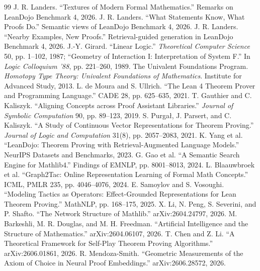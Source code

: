 \documentclass[11pt]{article}
\begin{document}
\begin{thebibliography}{99}\scriptsize
\setlength{\itemsep}{0pt}
 J. R. Landers. ``Textures of Modern Formal Mathematics.'' Remarks on LeanDojo Benchmark 4, 2026.
 J. R. Landers. ``What Statements Know, What Proofs Do.'' Semantic views of LeanDojo Benchmark 4, 2026.
 J. R. Landers. ``Nearby Examples, New Proofs.'' Retrieval-guided generation in LeanDojo Benchmark 4, 2026.
 J.-Y. Girard. ``Linear Logic.'' \emph{Theoretical Computer Science} 50, pp. 1--102, 1987; ``Geometry of Interaction I: Interpretation of System F.'' In \emph{Logic Colloquium '88}, pp. 221--260, 1989.
 The Univalent Foundations Program. \emph{Homotopy Type Theory: Univalent Foundations of Mathematics}. Institute for Advanced Study, 2013.
 L. de Moura and S. Ullrich. ``The Lean 4 Theorem Prover and Programming Language.'' CADE 28, pp. 625--635, 2021.
 T. Gauthier and C. Kaliszyk. ``Aligning Concepts across Proof Assistant Libraries.'' \emph{Journal of Symbolic Computation} 90, pp. 89--123, 2019.
 S. Purga\l, J. Parsert, and C. Kaliszyk. ``A Study of Continuous Vector Representations for Theorem Proving.'' \emph{Journal of Logic and Computation} 31(8), pp. 2057--2083, 2021.
 K. Yang et al. ``LeanDojo: Theorem Proving with Retrieval-Augmented Language Models.'' NeurIPS Datasets and Benchmarks, 2023.
 G. Gao et al. ``A Semantic Search Engine for Mathlib4.'' Findings of EMNLP, pp. 8001--8013, 2024.
 L. Blaauwbroek et al. ``Graph2Tac: Online Representation Learning of Formal Math Concepts.'' ICML, PMLR 235, pp. 4046--4076, 2024.
 E. Samoylov and S. Vosoughi. ``Modeling Tactics as Operators: Effect-Grounded Representations for Lean Theorem Proving.'' MathNLP, pp. 168--175, 2025.
 X. Li, N. Peng, S. Severini, and P. Shafto. ``The Network Structure of Mathlib.'' arXiv:2604.24797, 2026.
 M. Barkeshli, M. R. Douglas, and M. H. Freedman. ``Artificial Intelligence and the Structure of Mathematics.'' arXiv:2604.06107, 2026.
 T. Chen and Z. Li. ``A Theoretical Framework for Self-Play Theorem Proving Algorithms.'' arXiv:2606.01861, 2026.
 R. Mendoza-Smith. ``Geometric Measurements of the Axiom of Choice in Neural Proof Embeddings.'' arXiv:2606.28572, 2026.
\end{thebibliography}
\end{document}
